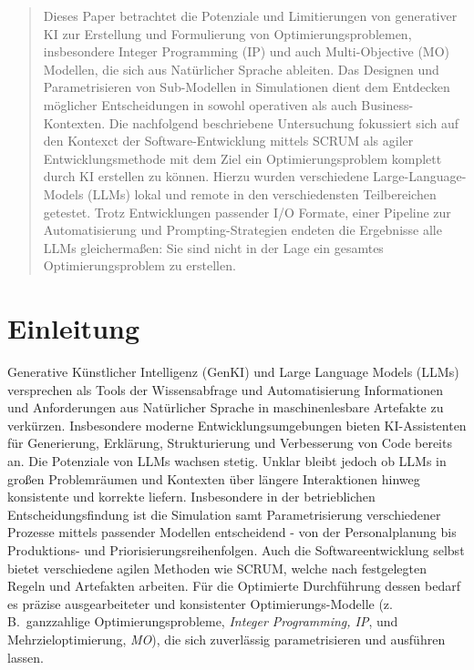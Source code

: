 \documentclass[runningheads]{llncs}
\begin{document}
\begin{abstract}

Dieses Paper betrachtet die Potenziale und Limitierungen von generativer KI zur Erstellung und Formulierung von Optimierungsproblemen, insbesondere Integer Programming (IP) und auch Multi-Objective (MO) Modellen, die sich aus Natürlicher Sprache ableiten. Das Designen und Parametrisieren von Sub-Modellen in Simulationen dient dem Entdecken möglicher Entscheidungen in sowohl operativen als auch Business-Kontexten. Die nachfolgend beschriebene Untersuchung fokussiert sich auf den Kontexct der Software-Entwicklung mittels SCRUM als agiler Entwicklungsmethode mit dem Ziel ein Optimierungsproblem komplett durch KI erstellen zu können. Hierzu wurden verschiedene Large-Language-Models (LLMs) lokal und remote in den verschiedensten Teilbereichen getestet. Trotz Entwicklungen passender I/O Formate, einer Pipeline zur Automatisierung und Prompting-Strategien endeten die Ergebnisse alle LLMs gleichermaßen: Sie sind nicht in der Lage ein gesamtes Optimierungsproblem zu erstellen. 
\end{abstract}


\section{Einleitung}
Generative Künstlicher Intelligenz (GenKI) und Large Language Models (LLMs) versprechen als Tools der Wissensabfrage und Automatisierung Informationen und Anforderungen aus Natürlicher Sprache in maschinenlesbare Artefakte zu verkürzen. Insbesondere moderne Entwicklungsumgebungen bieten KI-Assistenten für Generierung, Erklärung, Strukturierung und Verbesserung von Code bereits an. Die Potenziale von LLMs wachsen stetig. Unklar bleibt jedoch ob LLMs in großen Problemräumen und Kontexten über längere Interaktionen hinweg konsistente und korrekte liefern. 
Insbesondere in der betrieblichen Entscheidungsfindung ist die Simulation samt Parametrisierung verschiedener Prozesse mittels passender Modellen entscheidend - von der Personalplanung bis Produktions- und Priorisierungsreihenfolgen. Auch die Softwareentwicklung selbst bietet verschiedene agilen Methoden wie SCRUM, welche nach festgelegten Regeln und Artefakten arbeiten. Für die Optimierte Durchführung dessen bedarf es präzise ausgearbeiteter und konsistenter Optimierungs-Modelle (z.\,B.\ ganzzahlige Optimierungsprobleme, \emph{Integer Programming, IP}, und Mehrzieloptimierung, \emph{MO}), die sich zuverlässig parametrisieren und ausführen lassen.
\end{document}

